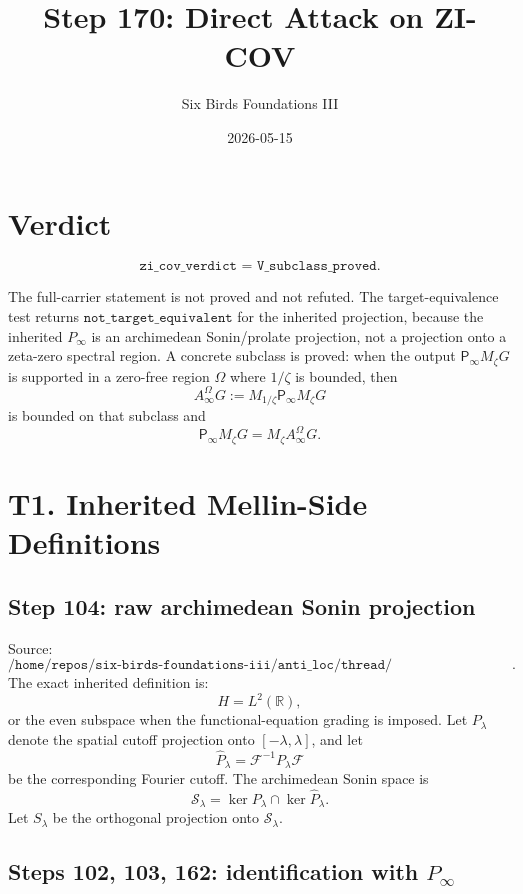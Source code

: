\documentclass[11pt]{article}
\title{Step 170: Direct Attack on ZI-COV}
\author{Six Birds Foundations III}
\date{2026-05-15}
\newcommand{\Pinf}{P_\infty}
\newcommand{\Psym}{\mathsf P_\infty}
\newcommand{\Mz}{M_\zeta}
\begin{document}
\maketitle

\section{Verdict}

\[
\boxed{\texttt{zi\_cov\_verdict = V\_subclass\_proved}.}
\]

The full-carrier statement is not proved and not refuted. The target-equivalence
test returns \(\texttt{not\_target\_equivalent}\) for the inherited projection,
because the inherited \(\Pinf\) is an archimedean Sonin/prolate projection, not
a projection onto a zeta-zero spectral region. A concrete subclass is proved:
when the output \(\Psym\Mz G\) is supported in a zero-free region \(\Omega\)
where \(1/\zeta\) is bounded, then
\[
  A_\infty^\Omega G:=M_{1/\zeta}\Psym\Mz G
\]
is bounded on that subclass and
\[
  \Psym\Mz G=\Mz A_\infty^\Omega G.
\]

\section{T1. Inherited Mellin-Side Definitions}

\subsection*{Step 104: raw archimedean Sonin projection}

Source:
\[
\texttt{/home/repos/six-birds-foundations-iii/anti\_loc/thread/step104\_shifted\_sonin\_artifacts/shifted\_sonin\_compactness\_step104.tex:25--34}.
\]
The exact inherited definition is:
\[
  H=L^2(\mathbb R),
\]
or the even subspace when the functional-equation grading is imposed. Let
\(P_\lambda\) denote the spatial cutoff projection onto \([-\lambda,\lambda]\),
and let
\[
  \widehat P_\lambda=\mathcal F^{-1}P_\lambda\mathcal F
\]
be the corresponding Fourier cutoff. The archimedean Sonin space is
\[
  \mathcal S_\lambda=\ker P_\lambda\cap\ker\widehat P_\lambda.
\]
Let \(S_\lambda\) be the orthogonal projection onto \(\mathcal S_\lambda\).

\subsection*{Steps 102, 103, 162: identification with \texorpdfstring{\(P_\infty\)}{P_infty}}
\end{document}
